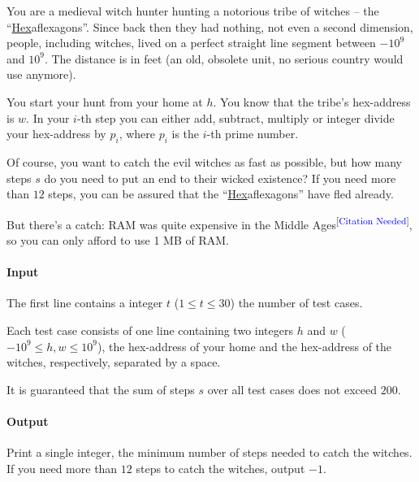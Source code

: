 



\makeheader

You are a medieval witch hunter hunting a notorious tribe of witches -- the “\underline{Hex}aflexagons”.
Since back then they had nothing, not even a second dimension, people, including witches, lived
on a perfect straight line segment between $-10^9$ and $10^9$. The distance is in feet (an old, obsolete unit,
no serious country would use anymore).

You start your hunt from your home at $h$. You know that the tribe's hex-address is $w$.
In your $i$-th step you can either add, subtract, multiply or integer divide your hex-address by $p_i$,
where $p_i$ is the $i$-th prime number.

Of course, you want to catch the evil witches as fast as possible, but
how many steps $s$ do you need to put an end to their wicked existence?
If you need more than $12$ steps, you can be assured that
the “\underline{Hex}aflexagons” have fled already.

But there's a catch:
RAM was quite expensive in the Middle Ages\textsuperscript{[\textcolor{blue}{Citation Needed}]},
so you can only afford to use 1 MB of RAM.

\paragraph*{Input}

The first line contains a integer $t$ ($1\leq t\leq 30$) the number of test cases.

Each test case consists of one line containing two integers%
$h$ and $w$ ($-10^9 \leq h, w \leq 10^9$), the hex-address of your home and the hex-address of the witches, respectively, separated by a space.

It is guaranteed that the sum of steps $s$ over all test cases does not exceed $200$.

\paragraph*{Output}

Print a single integer, the minimum number of steps needed to catch the witches.
If you need more than $12$ steps to catch the witches, output $-1$.

\begin{samples}
\end{samples}

